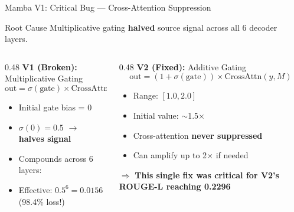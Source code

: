 \documentclass[10pt, aspectratio=169]{beamer}
\begin{document}
\begin{frame}{Mamba V1: Critical Bug --- Cross-Attention Suppression}
  \begin{alertblock}{Root Cause}
    Multiplicative gating \textbf{halved} source signal across all 6 decoder layers.
  \end{alertblock}

  \vspace{0.1cm}
  \small

  \begin{columns}[T]
    \begin{column}{0.48\textwidth}
      \textbf{V1 (Broken):} Multiplicative Gating
      \begin{equation}
        \text{out} = \sigma(\text{gate}) \times \text{CrossAttn}(y, M) \nonumber
      \end{equation}
      \begin{itemize}
        \item Initial gate bias = 0
        \item $\sigma(0) = 0.5$ $\rightarrow$ \textbf{halves signal}
        \item Compounds across 6 layers:
        \item Effective: $0.5^6 = 0.0156$ (98.4\% loss!)
      \end{itemize}
    \end{column}
    \begin{column}{0.48\textwidth}
      \textbf{V2 (Fixed):} Additive Gating
      \begin{equation}
        \text{out} = (1 + \sigma(\text{gate})) \times \text{CrossAttn}(y, M) \nonumber
      \end{equation}
      \begin{itemize}
        \item Range: $[1.0, 2.0]$
        \item Initial value: $\sim$1.5$\times$
        \item Cross-attention \textbf{never suppressed}
        \item Can amplify up to 2$\times$ if needed
      \end{itemize}

      \vspace{0.2cm}
      $\Rightarrow$ \textbf{This single fix was critical for V2's ROUGE-L reaching 0.2296}
    \end{column}
  \end{columns}
\end{frame}
\end{document}
